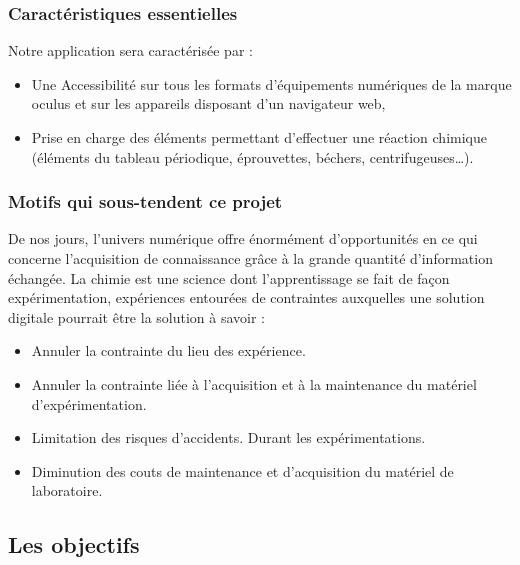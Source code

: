 \subsubsection{Caractéristiques essentielles}

Notre application sera caractérisée par :

\begin{itemize}
	\item Une Accessibilité sur tous les formats d’équipements numériques de la marque oculus et sur les appareils disposant d’un navigateur web,
	\item Prise en charge des éléments permettant d’effectuer une réaction chimique (éléments du tableau périodique, éprouvettes, béchers, centrifugeuses…).
\end{itemize}

\subsubsection{Motifs qui sous-tendent ce projet}

De nos jours, l’univers numérique offre énormément d'opportunités en ce qui concerne l'acquisition de connaissance grâce à la grande quantité d’information échangée. La chimie est une science dont l'apprentissage se fait de façon expérimentation, expériences entourées de contraintes auxquelles une solution digitale pourrait être la solution à savoir :

\begin{itemize}
	\item Annuler la contrainte du lieu des expérience.
	\item Annuler la contrainte liée à l’acquisition et à la maintenance du matériel d'expérimentation.
	\item Limitation des risques d’accidents. Durant les expérimentations.
	\item Diminution des couts de maintenance et d’acquisition du matériel de laboratoire.
\end{itemize}

\subsection{Les objectifs}


